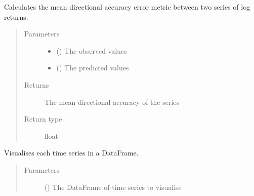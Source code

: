 \documentclass[letterpaper,10pt,english]{sphinxmanual}
\begin{document}
\begin{fulllineitems}
\label{\detokenize{index:Forecaster.eval_inspect.mean_directional_accuracy_log_ret}}
Calculates the mean directional accuracy error metric between
two series of log returns.
\begin{quote}\begin{description}
\item[{Parameters}] \leavevmode\begin{itemize}
\item {} 
 () \textendash{} The observed values

\item {} 
 () \textendash{} The predicted values

\end{itemize}

\item[{Returns}] \leavevmode
The mean directional accuracy of the series

\item[{Return type}] \leavevmode
float

\end{description}\end{quote}

\end{fulllineitems}


\begin{fulllineitems}
\label{\detokenize{index:Forecaster.eval_inspect.visualise_df}}
Visualises each time series in a DataFrame.
\begin{quote}\begin{description}
\item[{Parameters}] \leavevmode
{} () \textendash{} The DataFrame of time series to visualise

\end{description}\end{quote}

\end{fulllineitems}
\end{document}
